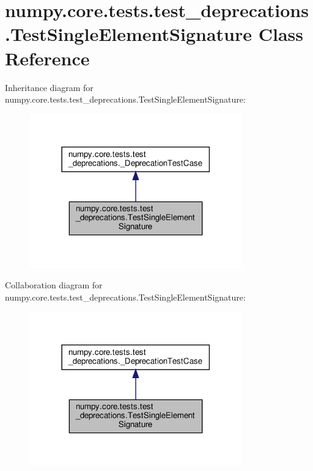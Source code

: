 \hypertarget{classnumpy_1_1core_1_1tests_1_1test__deprecations_1_1TestSingleElementSignature}{}\section{numpy.\+core.\+tests.\+test\+\_\+deprecations.\+Test\+Single\+Element\+Signature Class Reference}
\label{classnumpy_1_1core_1_1tests_1_1test__deprecations_1_1TestSingleElementSignature}


Inheritance diagram for numpy.\+core.\+tests.\+test\+\_\+deprecations.\+Test\+Single\+Element\+Signature\+:
\nopagebreak
\begin{figure}[H]
\begin{center}
\leavevmode
\includegraphics[width=261pt]{classnumpy_1_1core_1_1tests_1_1test__deprecations_1_1TestSingleElementSignature__inherit__graph}
\end{center}
\end{figure}


Collaboration diagram for numpy.\+core.\+tests.\+test\+\_\+deprecations.\+Test\+Single\+Element\+Signature\+:
\nopagebreak
\begin{figure}[H]
\begin{center}
\leavevmode
\includegraphics[width=261pt]{classnumpy_1_1core_1_1tests_1_1test__deprecations_1_1TestSingleElementSignature__coll__graph}
\end{center}
\end{figure}
